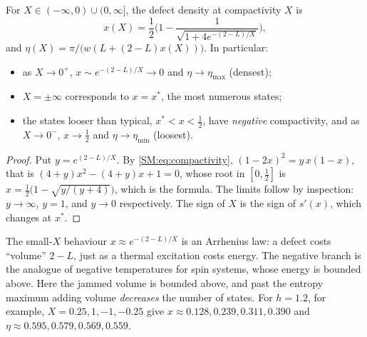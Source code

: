\begin{proposition}\label{SM:prop:eos}
For $X\in(-\infty,0)\cup(0,\infty]$, the defect density at compactivity $X$ is
\[
  x(X)=\frac12\Big(1-\frac1{\sqrt{1+4e^{-(2-L)/X}}}\Big),
\]
and $\eta(X)=\pi/\big(w(L+(2-L)x(X))\big)$. In particular:
\begin{itemize}[nosep]
\item as $X\to0^+$, $x\sim e^{-(2-L)/X}\to0$ and $\eta\to\eta_{\max}$ (densest);
\item $X=\pm\infty$ corresponds to $x=x^*$, the most numerous states;
\item the states looser than typical, $x^*<x<\frac12$, have \emph{negative} compactivity, and as $X\to0^-$,
  $x\to\frac12$ and $\eta\to\eta_{\min}$ (loosest).
\end{itemize}
\end{proposition}

\begin{proof}
Put $y=e^{(2-L)/X}$. By \eqref{SM:eq:compactivity}, $(1-2x)^2=y\,x(1-x)$, that is
$(4+y)x^2-(4+y)x+1=0$, whose root in $[0,\frac12]$ is $x=\frac12\big(1-\sqrt{y/(y+4)}\big)$, which is the
formula. The limits follow by inspection: $y\to\infty$, $y=1$, and $y\to0$ respectively. The sign of
$X$ is the sign of $s'(x)$, which changes at $x^*$.
\end{proof}

The small-$X$ behaviour $x\approx e^{-(2-L)/X}$ is an Arrhenius law: a defect costs ``volume'' $2-L$,
just as a thermal excitation costs energy. The negative branch is the analogue of negative temperatures
for spin systems, whose energy is bounded above. Here the jammed volume is bounded above, and past the
entropy maximum adding volume \emph{decreases} the number of states. For $h=1.2$, for example,
$X=0.25,1,-1,-0.25$ give $x\approx0.128,0.239,0.311,0.390$ and $\eta\approx0.595,0.579,0.569,0.559$.

